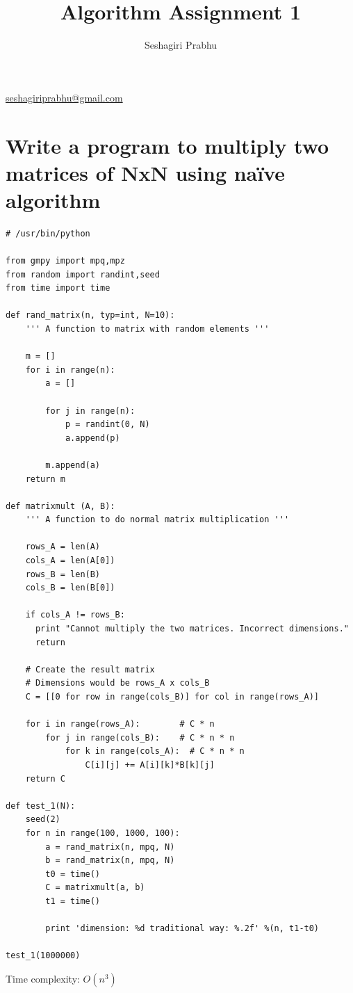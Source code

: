 \documentclass{article}
\title{Algorithm Assignment 1}
\author{Seshagiri Prabhu}
\begin{document}
\maketitle
\begin{center}
\href{mailto:seshagiriprabhu@gmail.com}{seshagiriprabhu@gmail.com}
\end{center}
\date{}

\section{Write a program to multiply two matrices of NxN using naïve algorithm}
\begin{lstlisting}
# /usr/bin/python

from gmpy import mpq,mpz
from random import randint,seed
from time import time

def rand_matrix(n, typ=int, N=10):
    ''' A function to matrix with random elements '''

    m = []
    for i in range(n):
        a = []

        for j in range(n):
            p = randint(0, N)
            a.append(p)

        m.append(a)
    return m

def matrixmult (A, B):
    ''' A function to do normal matrix multiplication '''

    rows_A = len(A)
    cols_A = len(A[0])
    rows_B = len(B)
    cols_B = len(B[0])

    if cols_A != rows_B:
      print "Cannot multiply the two matrices. Incorrect dimensions."
      return

    # Create the result matrix
    # Dimensions would be rows_A x cols_B
    C = [[0 for row in range(cols_B)] for col in range(rows_A)]

    for i in range(rows_A):        # C * n
        for j in range(cols_B):    # C * n * n
            for k in range(cols_A):  # C * n * n
                C[i][j] += A[i][k]*B[k][j]
    return C

def test_1(N):
    seed(2)
    for n in range(100, 1000, 100):
        a = rand_matrix(n, mpq, N)
        b = rand_matrix(n, mpq, N)
        t0 = time()
        C = matrixmult(a, b)
        t1 = time()

        print 'dimension: %d traditional way: %.2f' %(n, t1-t0)

test_1(1000000)
\end{lstlisting}

Time complexity: $O(n^{3})$\\
\end{document}
